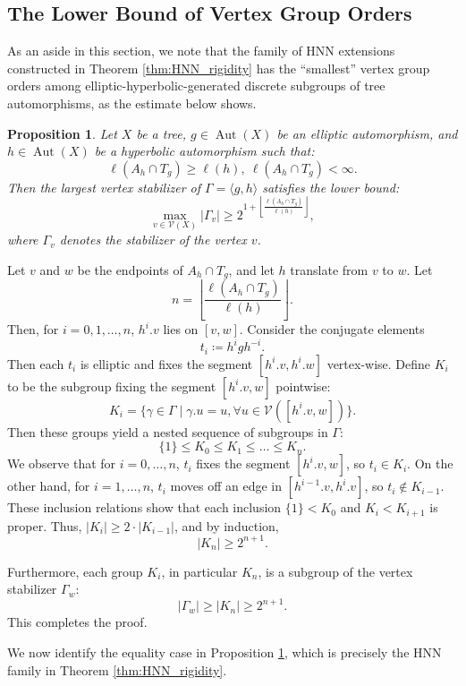 \documentclass[12pt,leqno]{amsart}
\makeatletter
\renewenvironment{proof}[1][\proofname]{%
	\par
	\pushQED{\qed}%
	\normalfont
	\topsep6\p@\@plus6\p@\relax
	\trivlist
	\item[\hskip\labelsep\itshape #1\@addpunct{.}]%
	\ignorespaces
}{%
	\par\nobreak\vspace{2pt}%
	\popQED%
	\medskip%
	\endtrivlist
	\@endpefalse
}
\newcommand{\2}{L^2_{\rm per}(0, T)}
\newtheorem{prop}{Proposition}[section]
\newcommand{\aut}{{\operatorname{Aut}}}
\numberwithin{equation}{section}
\numberwithin{figure}{section}
\makeatother
\begin{document}
\subsection{The Lower Bound of Vertex Group Orders}
As an aside in this section, we note that the family of HNN extensions constructed in Theorem \ref{thm:HNN_rigidity} has the ``smallest'' vertex group orders among elliptic-hyperbolic-generated discrete subgroups of tree automorphisms, as the estimate below shows.
\begin{prop}\label{thm:ellip_lower}
    Let $X$ be a tree, $g\in \aut(X)$ be an elliptic automorphism, and $h\in \aut(X)$ be a hyperbolic automorphism such that:
    \[
    \ell(A_h\cap T_g)\geq \ell(h),\ \ell(A_h\cap T_g)<\infty.
    \]
    Then the largest vertex stabilizer of $\Gamma = \langle g,h\rangle$ satisfies the lower bound:
    \[
        \max_{v\in\mathcal{V}(X)} \lvert \Gamma_v\rvert \geq 2^{1+\left\lfloor\frac{\ell(A_h\cap T_g)}{\ell(h)}\right\rfloor},
    \]
    where $\Gamma_v$ denotes the stabilizer of the vertex $v$.
\end{prop}
\begin{proof}
    Let $v$ and $w$ be the endpoints of $A_h\cap T_g$, and let $h$ translate from $v$ to $w$. Let
    \[
    n = \left\lfloor\frac{\ell(A_h\cap T_g)}{\ell(h)}\right\rfloor.
    \]
    Then, for $i=0,1,\dots,n$, $h^i.v$ lies on $[v,w]$. Consider the conjugate elements
    \[
    t_i\coloneqq h^igh^{-i}.
    \]
    Then each $t_i$ is elliptic and fixes the segment $[h^i.v,h^i.w]$ vertex-wise. Define $K_i$ to be the subgroup fixing the segment $[h^i.v,w]$ pointwise:
    \[
    K_i = \{\gamma\in\Gamma\mid \gamma.u = u,\forall u\in\mathcal{V}([h^i.v,w])\}.
    \]
    Then these groups yield a nested sequence of subgroups in $\Gamma$:
    \[
    \{1\}\leq K_0\leq K_1\leq\dots\leq K_n.
    \]
    We observe that for $i=0,\dots,n$, $t_i$ fixes the segment $[h^i.v,w]$, so $t_i\in K_i$. On the other hand, for $i=1,\dots,n$, $t_i$ moves off an edge in $[h^{i-1}.v,h^i.v]$, so $t_i\notin K_{i-1}$. These inclusion relations show that each inclusion $\{1\}<K_0$ and $K_i<K_{i+1}$ is proper. Thus, $\lvert K_i\rvert\geq 2\cdot\lvert K_{i-1}\rvert$, and by induction,
    \[
    \lvert K_n\rvert \geq 2^{n+1}.
    \]

    Furthermore, each group $K_i$, in particular $K_n$, is a subgroup of the vertex stabilizer $\Gamma_w$:
    \[
    \lvert\Gamma_w\rvert \geq \lvert K_n\rvert \geq 2^{n+1}.
    \]
    This completes the proof.
\end{proof}
We now identify the equality case in Proposition \ref{thm:ellip_lower}, which is precisely the HNN family in Theorem \ref{thm:HNN_rigidity}.
\end{document}
